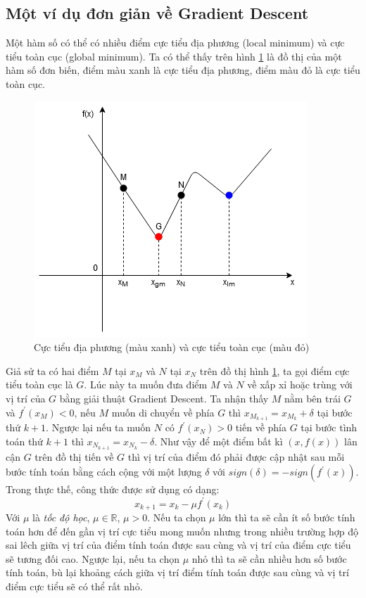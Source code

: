 \subsection{Một ví dụ đơn giản về Gradient Descent}
Một hàm số có thể có nhiều điểm cực tiểu địa phương (local minimum) và cực tiểu toàn cục (global minimum). Ta có thể thấy trên hình \ref{fig:minimums} là đồ thị của một hàm số đơn biến, điểm màu xanh là cực tiểu địa phương, điểm màu đỏ là cực tiểu toàn cục.
\begin{figure}[ht!]
	\centerline{\includegraphics[scale=0.8]{images/minimums.png}}
  	\caption{Cực tiểu địa phương (màu xanh) và cực tiểu toàn cục (màu đỏ)}
  	\label{fig:minimums}
\end{figure}
Giả sử ta có hai điểm $M$ tại $x_M$ và $N$ tại $x_N$ trên đồ thị hình \ref{fig:minimums}, ta gọi điểm cực tiểu toàn cục là $G$. Lúc này ta muốn đưa điểm $M$ và $N$ về xấp xỉ hoặc trùng với vị trí của $G$ bằng giải thuật Gradient Descent. Ta nhận thấy $M$ nằm bên trái $G$ và $f^{'}(x_{M})<0$, nếu $M$ muốn di chuyển về phía $G$ thì $x_{M_{k+1}}=x_{M_{k}}+\delta$ tại bước thứ $k+1$. Ngược lại nếu ta muốn $N$ có $f^{'}(x_{N})>0$ tiến về phía $G$ tại bước tình toán thứ $k+1$ thì $x_{N_{k+1}}=x_{N_{k}}-\delta$. Như vậy để một điểm bất kì $(x,f(x))$ lân cận $G$ trên đồ thị tiến về $G$ thì vị trí của điểm đó phải được cập nhật sau mỗi bước tính toán bằng cách cộng với một lượng $\delta$ với $sign(\delta)=-sign(f^{'}(x))$. Trong thực thế, công thức được sử dụng có dạng:
\begin{equation}
	x_{k+1}=x_{k}-{\mu}f^{'}(x_{k})
\end{equation}
Với $\mu$ là \emph{tốc độ học}, ${\mu}{\in}{\mathbb{R}}$, ${\mu}>0$. Nếu ta chọn $\mu$ lớn thì ta sẽ cần ít số bước tính toán hơn để đến gần vị trí cực tiểu mong muốn nhưng trong nhiều trường hợp độ sai lêch giữa vị trí của điểm tính toán được sau cùng và vị trí của điểm cực tiểu sẽ tương đối cao. Ngược lại, nếu ta chọn $\mu$ nhỏ thì ta sẽ cần nhiều hơn số bước tính toán, bù lại khoảng cách giữa vị trí điểm tính toán được sau cùng và vị trí điểm cực tiểu sẽ có thể rất nhỏ.

